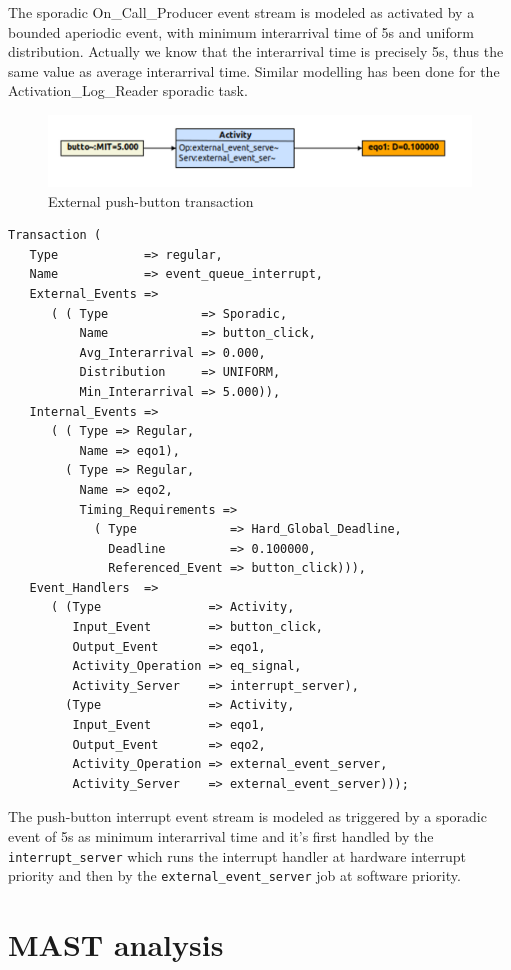 \documentclass{article}
\begin{document}
The sporadic On\_Call\_Producer event stream is modeled as activated by a bounded aperiodic event, with minimum interarrival time of 5s and uniform distribution. Actually we know that the interarrival time is precisely 5s, thus the same value as average interarrival time. Similar modelling has been done for the Activation\_Log\_Reader sporadic task.

\begin{figure}[!htbp]
\centering
\includegraphics[width=6in]{images/transaction-eq}
\caption{External push-button transaction}
\label{transaction-eq}
\end{figure}

\begin{lstlisting}
Transaction (
   Type            => regular,
   Name            => event_queue_interrupt,
   External_Events =>
      ( ( Type             => Sporadic,
          Name             => button_click,
          Avg_Interarrival => 0.000,
          Distribution     => UNIFORM,
          Min_Interarrival => 5.000)),
   Internal_Events =>
      ( ( Type => Regular,
          Name => eqo1),
        ( Type => Regular,
          Name => eqo2,
          Timing_Requirements =>
            ( Type             => Hard_Global_Deadline,
              Deadline         => 0.100000,
              Referenced_Event => button_click))),
   Event_Handlers  =>
      ( (Type               => Activity,
         Input_Event        => button_click,
         Output_Event       => eqo1,
         Activity_Operation => eq_signal,
         Activity_Server    => interrupt_server),
        (Type               => Activity,
         Input_Event        => eqo1,
         Output_Event       => eqo2,
         Activity_Operation => external_event_server,
         Activity_Server    => external_event_server)));
\end{lstlisting}

The push-button interrupt event stream is modeled as triggered by a sporadic event of 5s as minimum interarrival time and it's first handled by the \texttt{interrupt\_server} which runs the interrupt handler at hardware interrupt priority and then by the \texttt{external\_event\_server} job at software priority.

\section{MAST analysis}
\end{document}

